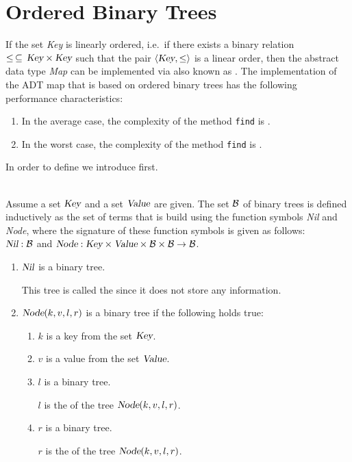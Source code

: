 \section{Ordered Binary Trees}
If the set \textsl{Key} is linearly ordered, i.e.~if there exists a binary relation
$\leq \,\subseteq\,\textsl{Key}\times\textsl{Key}$ such that the pair $\langle \textsl{Key}, \leq \rangle$ is a linear
order, then the abstract data type \textsl{Map} can be implemented via  
\href{https://en.wikipedia.org/wiki/Binary_search_tree}{} also known as
. 
The implementation of the ADT map that is based on ordered binary trees has the following performance
characteristics: 
\begin{enumerate}
\item In the average case, the complexity of the method \texttt{find} is .
\item In the worst case, the complexity of the method \texttt{find} is .  
\end{enumerate}
In order to define  we introduce  first.

\begin{Definition} \hspace*{\fill} \\
  Assume a set $\textsl{Key}$ and a set $\textsl{Value}$ are given.
  The set $\mathcal{B}$ of binary trees is defined inductively as the set of terms that is build using the
  function symbols \textsl{Nil} and \textsl{Node}, where the signature of these function symbols is
  given as follows: \\[0.2cm]
  \hspace*{1.3cm} 
  $\textsl{Nil}: \mathcal{B}$ \qquad and \qquad  $\textsl{Node}: \textsl{Key} \times \textsl{Value} \times \mathcal{B} \times \mathcal{B} \rightarrow \mathcal{B}$.
  \begin{enumerate}
  \item $\textsl{Nil}$ is a binary tree.

        This tree is called the  since it does not store any information.
  \item $\textsl{Node}(k, v, l, r)$ is a binary tree if the following holds true: 
        \begin{enumerate}
        \item $k$ is a key from the set $\textsl{Key}$.
        \item $v$ is a value from the set $\textsl{Value}$.
        \item $l$ is a binary tree.

              $l$ is the   of the tree $\textsl{Node}(k, v, l, r)$.
        \item $r$ is a binary tree.

              $r$ is the  of the tree $\textsl{Node}(k, v, l, r)$.
              \eox
        \end{enumerate}
  \end{enumerate}
\end{Definition}

